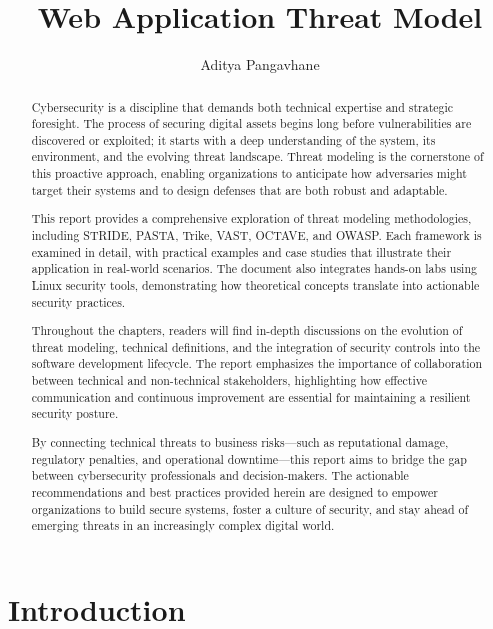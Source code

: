 \documentclass{article}
\title{Web Application Threat Model}
\author{Aditya Pangavhane}
\begin{document}
\maketitle

\begin{abstract}
Cybersecurity is a discipline that demands both technical expertise and strategic foresight. The process of securing digital assets begins long before vulnerabilities are discovered or exploited; it starts with a deep understanding of the system, its environment, and the evolving threat landscape. Threat modeling is the cornerstone of this proactive approach, enabling organizations to anticipate how adversaries might target their systems and to design defenses that are both robust and adaptable.

This report provides a comprehensive exploration of threat modeling methodologies, including STRIDE, PASTA, Trike, VAST, OCTAVE, and OWASP. Each framework is examined in detail, with practical examples and case studies that illustrate their application in real-world scenarios. The document also integrates hands-on labs using Linux security tools, demonstrating how theoretical concepts translate into actionable security practices.

Throughout the chapters, readers will find in-depth discussions on the evolution of threat modeling, technical definitions, and the integration of security controls into the software development lifecycle. The report emphasizes the importance of collaboration between technical and non-technical stakeholders, highlighting how effective communication and continuous improvement are essential for maintaining a resilient security posture.

By connecting technical threats to business risks—such as reputational damage, regulatory penalties, and operational downtime—this report aims to bridge the gap between cybersecurity professionals and decision-makers. The actionable recommendations and best practices provided herein are designed to empower organizations to build secure systems, foster a culture of security, and stay ahead of emerging threats in an increasingly complex digital world.
\end{abstract}



\section{Introduction}

\end{document}
